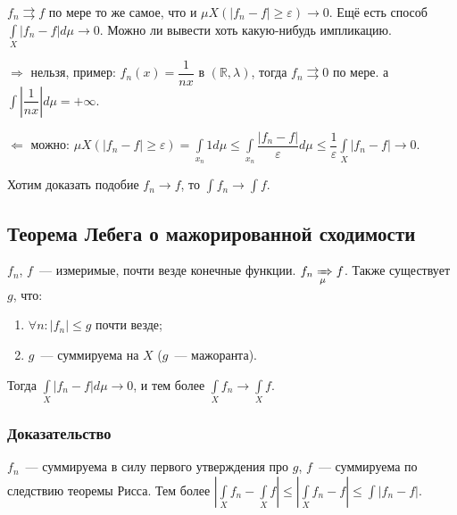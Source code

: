 \documentclass{article}
\begin{document}
        $f_n \rightrightarrows f$ по мере то же самое, что и $\mu X( |f_n - f| \geqslant \varepsilon) \rightarrow 0$. Ещё есть способ $\int\limits_X |f_n - f| d \mu \rightarrow 0$. Можно ли вывести хоть какую-нибудь импликацию.
        
        $\Rightarrow$ нельзя, пример: $f_n(x) = \dfrac{1}{nx}$ в $(\mathbb{R}, \lambda)$, тогда $f_n \rightrightarrows 0$ по мере. а $\int \left| \dfrac{1}{nx} \right| d \mu = +\infty$.
        
        $\Leftarrow$ можно: $\mu X ( |f_n - f| \geqslant \varepsilon) = \int\limits_{x_n} 1 d \mu \leqslant \int\limits_{x_n} \dfrac{|f_n - f|}{\varepsilon} d \mu \leqslant \dfrac{1}{\varepsilon} \int\limits_X |f_n - f| \rightarrow 0$.
        
        Хотим доказать подобие $f_n \rightarrow f$, то $\int f_n \rightarrow \int f$.
        
        \subsection{Теорема Лебега о мажорированной сходимости}
        
            $f_n$, $f$~--- измеримые, почти везде конечные функции. $f_n \xRightarrow[\mu]{} f$. Также существует $g$, что:
            
            \begin{enumerate}
            
                \item $\forall n : |f_n| \leqslant g$ почти везде;
                
                \item $g$~--- суммируема на $X$ ($g$~--- мажоранта).
                
            \end{enumerate}
        
            Тогда $\int\limits_X |f_n - f| d \mu \rightarrow 0$, и тем более $\int\limits_X f_n \rightarrow \int\limits_X f$.
            
            \subsubsection{Доказательство}
            
                $f_n$~--- суммируема в силу первого утверждения про $g$, $f$~--- суммируема по следствию теоремы Рисса. Тем более $\left| \int\limits_X f_n - \int\limits_X f \right| \leqslant \left| \int\limits_X f_n - f \right| \leqslant \int |f_n  - f|$.
                
\end{document}

